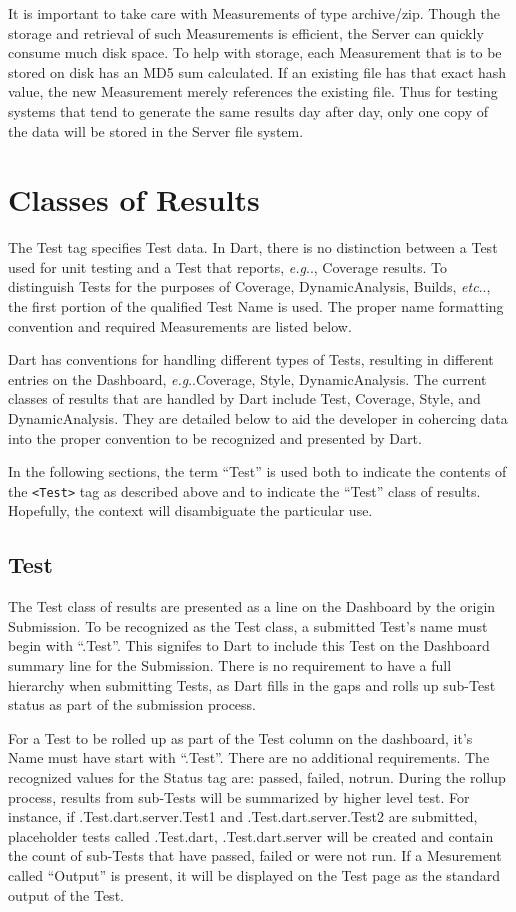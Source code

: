 \documentclass{InsightBook}
\makeatletter
\newcommand{\xmltag}[1]{\texttt{<#1>}}
\DeclareRobustCommand\onedot{\futurelet\@let@token\@onedot}
\def\@onedot{\ifx\@let@token.\else.\xspace\fi}
\def\eg{\emph{e.g}\onedot} \def\Eg{\emph{E.g}\onedot}
\def\etc{\emph{etc}\onedot}
\makeatother
\begin{document}
It is important to take care with Measurements of type archive/zip.
Though the storage and retrieval of such Measurements is efficient,
the Server can quickly consume much disk space.  To help with storage,
each Measurement that is to be stored on disk has an MD5 sum
calculated.  If an existing file has that exact hash value, the new
Measurement merely references the existing file.  Thus for testing
systems that tend to generate the same results day after day, only one
copy of the data will be stored in the Server file system.

\section{Classes of Results}
The Test tag specifies Test data.  In Dart, there is no
distinction between a Test used for unit testing and a Test that
reports, \eg, Coverage results.  To distinguish Tests for the
purposes of Coverage, DynamicAnalysis, Builds, \etc, the
first portion of the qualified Test Name is used.  The proper name
formatting convention and required Measurements are listed below.

Dart has conventions for handling different types of Tests, resulting
in different entries on the Dashboard, \eg Coverage, Style,
DynamicAnalysis.  The current classes of results that are handled by
Dart include Test, Coverage, Style, and DynamicAnalysis.  They are
detailed below to aid the developer in cohercing data into the proper
convention to be recognized and presented by Dart.

In the following sections, the term ``Test'' is used both to indicate
the contents of the \xmltag{Test} tag as described above and to indicate
the ``Test'' class of results.  Hopefully, the context will
disambiguate the particular use.

\subsection{Test}
The Test class of results are presented as a line on the Dashboard by
the origin Submission.  To be recognized as the Test class, a
submitted Test's name must begin with ``.Test''.  This signifes to
Dart to include this Test on the Dashboard summary line for the
Submission.  There is no requirement to have a full hierarchy when
submitting Tests, as Dart fills in the gaps and rolls up sub-Test
status as part of the submission process.

For a Test to be rolled up as part of the Test column on the
dashboard, it's Name must have start with ``.Test''.  There are no
additional requirements.  The recognized values for the Status tag
are: passed, failed, notrun.  During the rollup process, results from
sub-Tests will be summarized by higher level test.  For instance, if
.Test.dart.server.Test1 and .Test.dart.server.Test2 are submitted, 
placeholder tests called .Test.dart, .Test.dart.server will be created
and contain the count of sub-Tests that have passed, failed or were
not run.  If a Mesurement called ``Output'' is present, it will be
displayed on the Test page as the standard output of the Test.
\end{document}
